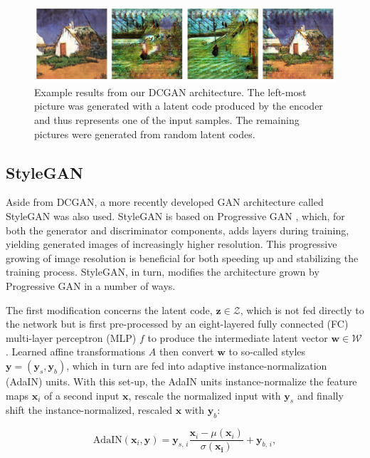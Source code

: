 \documentclass{article}
\begin{document}
\begin{figure}
    \centering
    \includegraphics[width=\linewidth]{report/img/dcgan2.png}
    \caption{Example results from our DCGAN architecture. The left-most picture was generated with a latent code produced by the encoder and thus represents one of the input samples. The remaining pictures were generated from random latent codes.}
    \label{fig:dcgan}
\end{figure}

\subsection{StyleGAN}
Aside from DCGAN, a more recently developed GAN architecture called StyleGAN \cite{karras2019stylebased} was also used. StyleGAN is based on Progressive GAN \cite{karras2018progressive}, which, for both the generator and discriminator components, adds layers during training, yielding generated images of increasingly higher resolution. This progressive growing of image resolution is beneficial for both speeding up and stabilizing the training process. StyleGAN, in turn, modifies the architecture grown by Progressive GAN in a number of ways. 

The first modification concerns the latent code, $\mathbf{z} \in \mathcal{Z}$, which is not fed directly to the network but is first pre-processed by an eight-layered fully connected (FC) multi-layer perceptron (MLP) $f$ to produce the intermediate latent vector $\mathbf{w} \in \mathcal{W}$. Learned affine transformations $A$ then convert $\mathbf{w}$ to so-called styles $\mathbf{y} = (\mathbf{y}_s, \mathbf{y}_b)$, which in turn are fed into adaptive instance-normalization (AdaIN) units. With this set-up, the AdaIN units instance-normalize the feature maps $\mathbf{x}_i$ of a second input $\mathbf{x}$, rescale the normalized input with $\mathbf{y}_s$ and finally shift the instance-normalized, rescaled $\mathbf{x}$ with $\mathbf{y}_b$: 

\begin{equation}
    \text{AdaIN}(\mathbf{x}_i, \mathbf{y}) = \mathbf{y}_{s,\, i} \frac{\mathbf{x}_i - \mu(\mathbf{x}_i)}{\sigma(\mathbf{x_i})} + \mathbf{y}_{b,\, i},
\end{equation}
\end{document}
